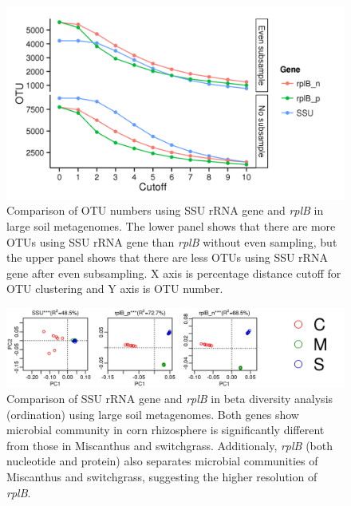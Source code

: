 \documentclass[]{msu-thesis}
\begin{document}
\begin{figure}[tbph!]
  \centering
  \includegraphics[scale=1]{figs/otu_metag}
  \caption[Comparison of SSU rRNA gene and \textit{rplB} in soil metagenomes]{Comparison of OTU numbers using SSU rRNA gene and \textit{rplB} in large soil metagenomes. The lower panel shows that there are more OTUs using SSU rRNA gene than \textit{rplB} without even sampling, but the upper panel shows that there are less OTUs using SSU rRNA gene after even subsampling. X axis is percentage distance cutoff for OTU clustering and Y axis is OTU number.}
  \label{fig:otuMetag}
\end{figure}


\begin{figure}[tbph!]
  \centering
  \includegraphics[scale=1]{figs/pca_metag}
  \caption[Comparison of SSU rRNA gene and \textit{rplB} in beta diversity using large soil metagenomes]{Comparison of SSU rRNA gene and \textit{rplB} in beta diversity analysis (ordination) using large soil metagenomes. Both genes show microbial community in corn rhizosphere is significantly different from those in Miscanthus and switchgrass. Additionaly, \textit{rplB} (both nucleotide and protein) also separates microbial communities of Miscanthus and switchgrass, suggesting the higher resolution of \textit{rplB}.}
  \label{fig:pcaMetag}
\end{figure}
\end{document}
